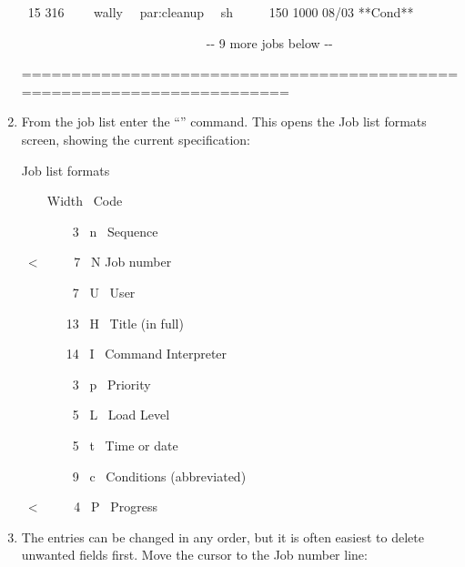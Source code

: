 \begin{enumerate}
\begin{exparasmall}
\ 15 316 \ \ \ \ wally \ \ par:cleanup \ \ sh \ \ \ \ \ 150 1000 08/03
**Cond**

\ \ \ \ \ \ \ \ \ \ \ \ \ \ \ \ \ \ \ \ \ \ \ \ \ \ \ \ \ {}-{}- 9 more
jobs below -{}-

=======================================================================

\end{exparasmall}

\item From the job list enter the ``\userentry{,}'' command. This
opens the Job list formats screen, showing the current specification:

\begin{expara}

Job list formats

\ \ \ \ Width \ Code

\ \ \ \ \ \ \ \ 3 \ n \ Sequence

{\textquotedbl} {\textquotedbl}

\ {\textless} \ \ \ \ \ 7 \ N Job number

{\textquotedbl} {\textquotedbl}

\ \ \ \ \ \ \ \ 7 \ U \ User

{\textquotedbl} {\textquotedbl}

\ \ \ \ \ \ \ 13 \ H \ Title (in full)

{\textquotedbl} {\textquotedbl}

\ \ \ \ \ \ \ 14 \ I \ Command Interpreter

{\textquotedbl} {\textquotedbl}

\ \ \ \ \ \ \ \ 3 \ p \ Priority

\ \ \ \ \ \ \ \ 5 \ L \ Load Level

{\textquotedbl} {\textquotedbl}

\ \ \ \ \ \ \ \ 5 \ t \ Time or date

{\textquotedbl} {\textquotedbl}

\ \ \ \ \ \ \ \ 9 \ c \ Conditions (abbreviated)

{\textquotedbl} {\textquotedbl}

\ {\textless} \ \ \ \ \ 4 \ P \ Progress

\end{expara}

\item The entries can be changed in any order, but it is often easiest to delete unwanted fields first. Move the cursor to the Job number
line:

\begin{expara}


\end{expara}
\end{enumerate}
